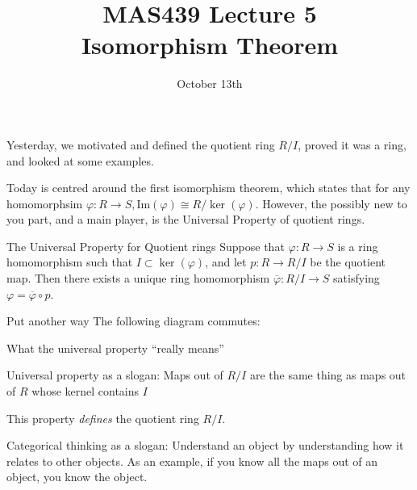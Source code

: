 \documentclass{beamer}
\title{MAS439 Lecture 5 \\ Isomorphism Theorem}
\date{October 13th}
\begin{document}
\begin{frame}
\titlepage
\end{frame}


\begin{frame}{}
Yesterday, we motivated and defined the quotient ring $R/I$, proved it was a ring, and looked at some examples.

Today is centred around the first isomorphism theorem, which states that for any homomorphsim $\varphi:R\to S, \textrm{Im}(\varphi)\cong R/\ker(\varphi)$.  However, the possibly new to you part, and a main player, is the Universal Property of quotient rings.

\end{frame}

\begin{frame}[fragile]{The Universal Property for Quotient rings}
Suppose that $\varphi:R \to S$ is a ring homomorphism such that $I\subset \ker(\varphi)$, and let $p:R\to R/I$ be the quotient map.   Then there exists a unique ring homomorphism $\overline{\varphi}:R/I\to S$ satisfying $\varphi=\overline{\varphi}\circ p$.

\begin{block}{Put another way}
The following diagram commutes:
\begin{center}
\end{center}
\end{block}

\end{frame}

\begin{frame}{What the universal property ``really means''}
\begin{block}{Universal property as a slogan:}
Maps out of $R/I$ are the same thing as maps out of $R$ whose kernel contains $I$
\end{block}

This property \emph{defines} the quotient ring $R/I$.

\begin{block}{Categorical thinking as a slogan:}
Understand an object by understanding how it relates to other objects.  As an example, if you know all the maps out of an object, you know the object.
\end{block}
\end{frame}
\end{document}
